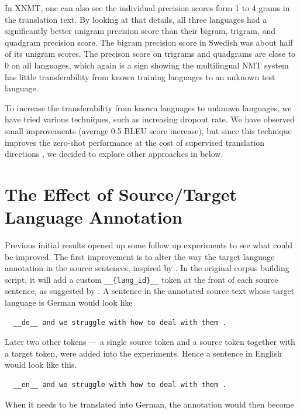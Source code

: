 \documentclass[thesis,fonts=libertine]{cluu}
\begin{document}
In XNMT, one can also see the individual precision scores form 1 to 4 grams in the translation text. By looking at that details, all three languages had a significantly better unigram precision score than their bigram, trigram, and quadgram precision score. The bigram precision score in Swedish was about half of its unigram scores. The precison score on trigrams and quadgrams are close to 0 on all languages, which again is a sign showing the multilingual NMT system has little transferability from known training languages to an unknown test language.

To increase the transferability from known languages to unknown languages, we have tried various techniques, such as increasing dropout rate. We have observed small improvements (average 0.5 BLEU score increase), but since this technique improves the zero-shot performance at the cost of supervised translation directions \textcite{Arivazhagan:2019aa}, we decided to explore other approaches in below.

\section{The Effect of Source/Target Language Annotation}
\label{sec:results_source_and_target_annotation}

Previous initial results opened up some follow up experiments to see what could be improved. The first improvement is to alter the way the target language annotation in the source sentences, inspired by \textcite{Blackwood:2018aa}. In the original corpus building script, it will add a custom \verb|__{lang_id}__| token at the front of each source sentence, as suggested by \textcite{Johnson:2016aa}. A sentence in the annotated source text whose target language is German would look like 

\begin{verbatim}
  __de__ and we struggle with how to deal with them .
\end{verbatim}

Later two other tokens --- a single source token and a source token together with a target token, were added into the experiments. Hence a sentence in English would look like this. 

\begin{verbatim}
  __en__ and we struggle with how to deal with them .
\end{verbatim}

When it needs to be translated into German, the annotation would then become 
\end{document}
